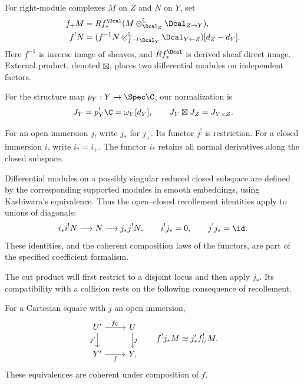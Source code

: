 For right-module complexes $M$ on $Z$ and $N$ on $Y$, set
\begin{align}
 f_+M&=Rf_*^{\Ocal}
       (M\otimes_{\Dcal_Z}^{\mathbb L}\Dcal_{Z\to Y}),
       \label{eq:vol2-dmodule-direct}\\
 f^!N&=(f^{-1}N\otimes_{f^{-1}\Dcal_Y}^{\mathbb L}
                  \Dcal_{Y\leftarrow Z})[d_Z-d_Y].
       \label{eq:vol2-dmodule-inverse}
\end{align}
Here $f^{-1}$ is inverse image of sheaves, and $Rf_*^{\Ocal}$
is derived sheaf direct image. External product, denoted $\boxtimes$,
places two differential modules on independent factors.

For the structure map $p_Y:Y\to\Spec\C$, our normalization is
\begin{equation}\label{eq:vol2-dualizing-shift}
 J_Y=p_Y^!\C=\omega_Y[d_Y],\qquad
 J_Y\boxtimes J_Z=J_{Y\times Z}.
\end{equation}

For an open immersion $j$, write $j_*$ for $j_+$. Its functor
$j^!$ is restriction. For a closed immersion $i$, write $i_*=i_+$.
The functor $i_*$ retains all normal derivatives along the closed
subspace.

Differential modules on a possibly singular reduced
closed subspace are defined by the corresponding supported modules
in smooth embeddings, using Kashiwara's equivalence. Thus the
open--closed recollement identities apply to unions of diagonals:
\begin{equation}\label{eq:vol2-open-recollement}
 i_*i^!N\longrightarrow N\longrightarrow j_*j^!N,
 \qquad i^!j_*=0,\qquad j^!j_*=\id.
\end{equation}
These identities, and the coherent composition laws of the functors,
are part of the specified coefficient formalism.

The cut product will first restrict to a disjoint locus and then
apply $j_*$. Its compatibility with a collision rests on the
following consequence of recollement.

\begin{lemma}\label{lem:vol2-open-basechange}
For a Cartesian square with $j$ an open immersion,
\[
 \begin{tikzcd}
 U'\arrow[r,"f_U"]\arrow[d,"j'"']&U\arrow[d,"j"]\\
 Y'\arrow[r,"f"']&Y,
 \end{tikzcd}
 \qquad
 f^!j_*M\simeq j'_*f_U^!M.
\]
These equivalences are coherent under composition of $f$.
\end{lemma}

